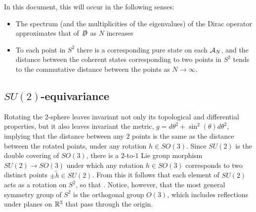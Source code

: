 In this document, this will occur in the following senses:

    \begin{itemize}
    
    \item The spectrum (and the multiplicities of the eigenvalues) of the Dirac operator approximates that of $\slashed D$ as $N$ increases
    
    \item To each point in $S^2$ there is a corresponding pure state on each $\mathcal A_N$, and the distance between the coherent states corresponding to two points in $S^2$ tends to the commutative distance between the points as $N \to \infty$.
    
    \end{itemize}

\subsection{$SU(2)$-equivariance}

Rotating the 2-sphere leaves invariant not only its topological and differential properties, but it also leaves invariant the metric, $g = d\theta^2 + \sin^2(\theta) d\theta^2$, implying that the distance between any $2$ points is the same as the distance between the rotated points, under any rotation $h \in SO(3)$. Since $SU(2)$ is the double covering of $SO(3)$, there is a $2$-to-$1$ Lie group morphism $SU(2) \to SO(3)$ under which any rotation $h \in SO(3)$ corresponds to two distinct points $\pm \tilde h \in SU(2)$. From this it follows that each element of $SU(2)$ acts as a rotation on $S^2$, so that . Notice, however, that the most general symmetry group of $S^2$ is the orthogonal group $O(3)$, which includes reflections under planes on $\mathbb{R}^3$ that pass through the origin.


